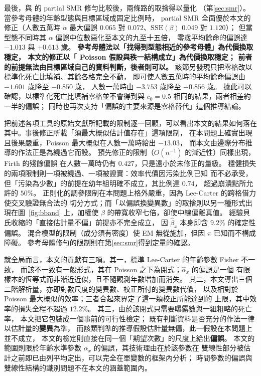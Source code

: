 \documentclass[UTF8, fontset=macnew, a4paper, 12pt]{ctexart}
\begin{document}
最後，與 \citet{lee2003}的 partial SMR 修勻比較後，兩條路的取捨得以量化
（第\ref{sec:smr}）。當參考母體的年齡型態與目標區域成固定比例時，
partial SMR 全面優於本文的修正（人數五萬時 $\alpha$ 最大偏誤 $0.065$
對 $0.072$、$\mathrm{SSE}(\beta)$ $0.049$ 對 $1.120$）；
但當型態不同時其 $\alpha$ 偏誤中位數惡化至本文的九至十五倍，
零歲平均餘命的偏誤達 $-1.013$ 與 $+0.613$ 歲。
\textbf{參考母體法以「找得到型態相近的參考母體」為代價換取穩定，
本文的修正以「 Poisson 假設與秩一結構成立」為代價換取穩定；
前者的前提無法由目標區域自己的資料判斷，後者則可以。}
該節另發現只把零格改以標準化死亡比填補、其餘各格完全不動，
即可使人數五萬時的平均餘命偏誤由 $-1.601$ 歲降至 $-0.850$ 歲，
人數一萬時由 $-3.753$ 歲降至 $-0.856$ 歲。
據此可以確認，以標準化死亡比填補零格並不會得到與
$c_0=0.5$ 相同的結果，兩者相差約一半的偏誤；
同時也再次支持「偏誤的主要來源是零格替代」這個推導結論。

把前述各項工具的原始文獻所記載的限制逐一回顧，可以看出本文的結果如何落在
其中。事後修正所載「須最大概似估計值存在」這項限制，
在本問題上確實出現且後果嚴重，Poisson 最大概似在人數一萬時給出 $-13.03$，
而本文由邊際分布推導的作法正是為繞過它而設。
預先修正的限制（$O(n^{-1})$ 的漸近性）同樣出現，Firth 的殘餘偏誤
在人數一萬時仍有 $0.427$，只是遠小於未修正的量級。
穩健損失的兩項限制則一項被繞過、一項被證實：效率代價因污染比例已知
而不必承受，但「污染為少數」的前提在幼年組明確不成立，其比例達 $0.74$，
超過崩潰點所允許的 $50\%$。
正則化的調參限制在本問題上格外嚴重，因為 Lee-Carter 的跨格借力使交叉驗證無合法的
切分方式；而「以偏誤換變異數」的取捨則以另一種形式出現在圖~\ref{fig:bband}
上，加權使 $\beta$ 的帶寬收窄七倍，卻使中線偏離真值。
經驗貝氏收縮的「直接估計量不偏」前提亦不完全成立，
因 $\hat\beta_x$ 本身即含 $9.2\%$ 的確定性偏誤。
混合模型的限制（成分須有密度）使 EM 無從施加，但因 $\pi$ 已知而不構成障礙。
參考母體修勻的限制則在第\ref{sec:smr}得到定量的確認。

就全局而言，本文的貢獻有三項。其一，標準 Lee-Carter 的年齡參數 Fisher 不一致，
而該不一致有一般形式，其在 Poisson 之下為閉式；$\hat\alpha_x$ 的偏誤是一個
有限樣本的恆等式而非漸近近似，且不隨觀測年數增加而消失。
其二，本文導出三個二階解析量，亦即對數尺度的變異數、校正所付的變異數代價，
以及相對於 Poisson 最大概似的效率；三者合起來界定了這一類校正所能達到的
上限，其中效率的損失全程不超過 $12.2\%$。
其三，由於該閉式只需要曝露數與一組粗略的死亡率，
本文把它包裝成一個事前的可行性檢定；
既有判斷資料是否充分的作法一律以估計量的\textbf{變異}為準，
而該類判準的推導假設估計量無偏，此一假設在本問題上並不成立，
本文的檢定則直接在同一個「期望次數」的尺度上給出\textbf{偏誤}。
本文的範圍則限於年齡水準參數 $\alpha_x$ 的偏誤，其技術理由在於該參數在
雙線性部分被估計之前即已由列平均定出，可以完全在單變數的框架內分析；
時間參數的偏誤與雙線性結構的識別問題不在本文的涵蓋範圍內。
\end{document}
